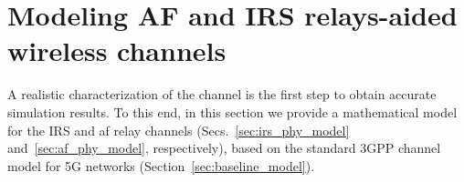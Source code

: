 

 
\section{Modeling AF and IRS relays-aided wireless channels}
\label{sec:ch_model_ext}

A realistic characterization of the channel is the first step to obtain accurate simulation results. 
To this end, in this section we provide a mathematical model for the IRS and \gls{af} relay channels (Secs.~\ref{sec:irs_phy_model} and~\ref{sec:af_phy_model}, respectively), based on the standard 3GPP channel model for 5G networks (Section~\ref{sec:baseline_model}). %

